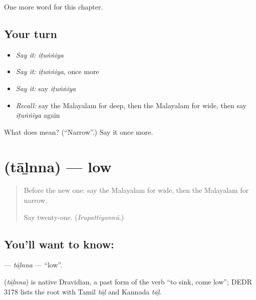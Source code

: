 \begin{grammarlens}[title={What you've built}]
One more word for this chapter.
\end{grammarlens}

\subsection*{Your turn}
\begin{itemize}
\raggedright
  \item \emph{Say it:} \emph{iṭuṅṅiya}
  \item \emph{Say it:} \emph{iṭuṅṅiya}, once more
  \item \emph{Say it:} say \emph{iṭuṅṅiya}
  \item \emph{Recall:} say the Malayalam for deep, then the Malayalam for wide, then say \emph{iṭuṅṅiya} again
\end{itemize}

\begin{tcolorbox}[breakable,colback=teal!4,colframe=teal!35!black,title={Before you move on}]
What does  mean? (\textquotedblleft{}Narrow\textquotedblright{}.) Say it once more.
\end{tcolorbox}
\section[\texorpdfstring{\ml{താഴ്ന്ന} (tāḻnna)}{താഴ്ന്ന (tāḻnna)}]{ (tāḻnna) — low}

\label{lesson:ML-C168-talnna}



\begin{quote}
Before the new one: say the Malayalam for wide, then the Malayalam for narrow.

Say twenty-one. (\emph{Irupattiyonnŭ}.)
\end{quote}

\subsection*{You'll want to know: }
\textbf{} — \emph{tāḻnna} — \textquotedblleft{}low\textquotedblright{}.

\begin{cousinweb}
\textbf{} (\emph{tāḻnna}) is native Dravidian, a past form of the verb \textquotedblleft{}to sink, come low\textquotedblright{}; DEDR 3178 lists the root with Tamil \emph{tāḻ} and Kannada \emph{tāḻ}.
\end{cousinweb}

